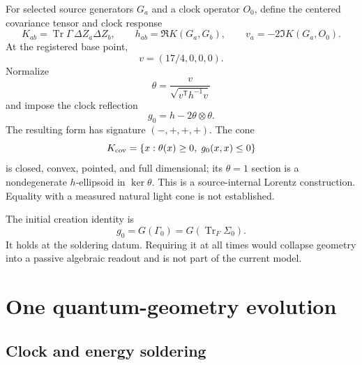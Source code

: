 \documentclass[12pt,a4paper,twoside]{article}
\begin{document}
For selected source generators $G_a$ and a clock operator $O_0$, define the centered covariance tensor and clock response
\begin{equation}
K_{ab}=\operatorname{Tr}\Gamma\,\Delta Z_a\Delta Z_b,
\qquad
h_{ab}=\Re K(G_a,G_b),
\qquad
v_a=-2\Im K(G_a,O_0).
\label{eq:covariance}
\end{equation}
At the registered base point,
\begin{equation}
v=(17/4,0,0,0).
\end{equation}
Normalize
\begin{equation}
\theta=\frac{v}{\sqrt{v^{\mathsf T}h^{-1}v}}
\end{equation}
and impose the clock reflection
\begin{equation}
g_0=h-2\theta\otimes\theta.
\label{eq:clockreflection}
\end{equation}
The resulting form has signature $(-,+,+,+)$. The cone
\begin{equation}
K_{\rm cov}=\{x:\theta(x)\geq0,\;g_0(x,x)\leq0\}
\end{equation}
is closed, convex, pointed, and full dimensional; its $\theta=1$ section is a nondegenerate $h$-ellipsoid in $\ker\theta$. This is a source-internal Lorentz construction. Equality with a measured natural light cone is not established.

The initial creation identity is
\begin{equation}
g_0=G(\Gamma_0)=G(\operatorname{Tr}_F\Sigma_0).
\label{eq:creationidentity}
\end{equation}
It holds at the soldering datum. Requiring it at all times would collapse geometry into a passive algebraic readout and is not part of the current model.

\section{One quantum-geometry evolution}

\subsection{Clock and energy soldering}
\end{document}
